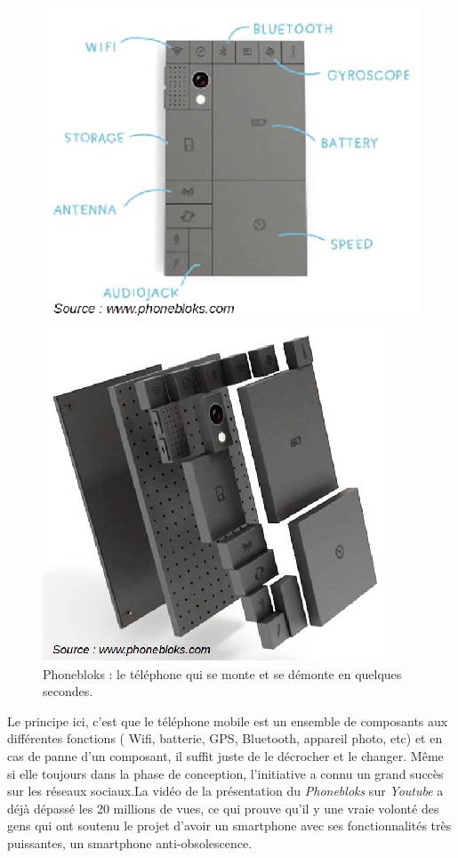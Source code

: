 \begin{figure}[h]
\begin{minipage}{0.5\linewidth}
\begin{center}
\includegraphics[scale=0.6]{Rsc/phonebloks2.png} 
\end{center}
\end{minipage}
\begin{minipage}{0.5\linewidth}
\begin{center}
\includegraphics[scale=0.7]{Rsc/phonebloks1.png} 
\end{center}
\end{minipage}
\caption{\scriptsize{Phonebloks : le téléphone qui se monte et se démonte en quelques secondes.}}
\label{phonebloks}
\end{figure}


 Le principe ici, c'est que le téléphone mobile est un ensemble de composants aux différentes fonctions ( Wifi, batterie, GPS, Bluetooth, appareil photo, etc) et en cas de panne d'un composant, il suffit juste de le décrocher et le changer. 
Même si elle toujours dans la phase de conception, l'initiative a connu un grand succès sur les réseaux sociaux.La vidéo de la présentation du \textit{Phonebloks} sur \textit{Youtube} a déjà dépassé les 20 millions de vues, ce qui prouve qu'il y une vraie volonté des gens qui ont soutenu le projet d'avoir un smartphone avec ses fonctionnalités très puissantes, un smartphone anti-obsolescence. 